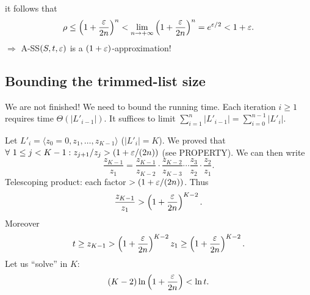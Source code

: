 it follows that
\[\rho\leq\left(1+\frac{\varepsilon}{2n}\right)^n
<\lim_{n\to+\infty}\left(1+\frac{\varepsilon}{2n}\right)^n=e^{\varepsilon/2}<1+\varepsilon.\]
$\Rightarrow$ A-SS$(S,t,\varepsilon)$ is a $(1+\varepsilon)$-approximation!

\subsection{Bounding the trimmed-list size}
We are not finished! We need to bound the running time.
Each iteration $i\geq1$ requires time $\Theta(|L'_{i-1}|)$.
It suffices to limit $\sum_{i=1}^n|L'_{i-1}|=\sum_{i=0}^{n-1}|L'_i|$.

Let $L'_i=\langle z_0=0,z_1,\ldots,z_{K-1}\rangle$ ($|L'_i|=K$).
We proved that $\forall\ 1\leq j<K-1:z_{j+1}/z_j>(1+\varepsilon/(2n))$ (see PROPERTY).
We can then write
\[\frac{z_{K-1}}{z_1}=\frac{z_{K-1}}{z_{K-2}}\cdot\frac{z_{K-2}}{z_{K-3}}
\cdots\frac{z_3}{z_2}\cdot\frac{z_2}{z_1}.\]
Telescoping product: each factor $>(1+\varepsilon/(2n))$.
Thus
\[\frac{z_{K-1}}{z_1}>\left(1+\frac{\varepsilon}{2n}\right)^{K-2}.\]
Moreover
\[t\geq z_{K-1}>\left(1+\frac{\varepsilon}{2n}\right)^{K-2}z_1
\geq\left(1+\frac{\varepsilon}{2n}\right)^{K-2}.\]
Let us ``solve'' in $K$:
\[(K-2)\ln\left(1+\frac{\varepsilon}{2n}\right)<\ln t.\]
